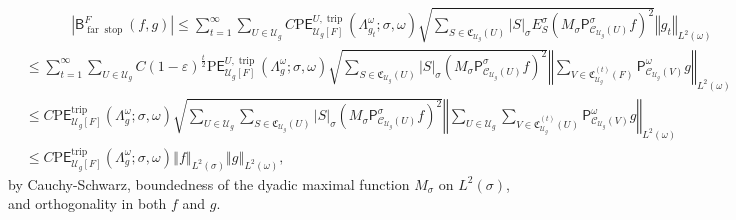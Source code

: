 \documentclass{amsart}%
\theoremstyle{plain}
\numberwithin{equation}{section}
\begin{document}
\begin{align}
& \ \ \ \ \ \ \ \ \ \ \ \ \ \ \ \left\vert \mathsf{B}_{\operatorname{far}%
\operatorname*{stop}}^{F}\left(  f,g\right)  \right\vert \leq\sum
_{t=1}^{\infty}\sum_{U\in\mathcal{U}_{g}}C\mathrm{P}\mathsf{E}_{\mathcal{U}%
_{g}\left[  F\right]  }^{U,\operatorname*{trip}}\left(  \Lambda_{g_{t}%
}^{\omega};\sigma,\omega\right)  \sqrt{\sum_{S\in\mathfrak{C}_{\mathcal{U}%
_{g}}\left(  U\right)  }\left\vert S\right\vert _{\sigma}E_{S}^{\sigma}\left(
M_{\sigma}\mathsf{P}_{\mathcal{C}_{\mathcal{U}_{g}}\left(  U\right)  }%
^{\sigma}f\right)  ^{2}}\left\Vert g_{t}\right\Vert _{L^{2}\left(
\omega\right)  }\label{far below stop}\\
& \leq\sum_{t=1}^{\infty}\sum_{U\in\mathcal{U}_{g}}C\left(  1-\varepsilon
\right)  ^{\frac{t}{2}}\mathrm{P}\mathsf{E}_{\mathcal{U}_{g}\left[  F\right]
}^{U,\operatorname*{trip}}\left(  \Lambda_{g}^{\omega};\sigma,\omega\right)
\sqrt{\sum_{S\in\mathfrak{C}_{\mathcal{U}_{g}}\left(  U\right)  }\left\vert
S\right\vert _{\sigma}\left(  M_{\sigma}\mathsf{P}_{\mathcal{C}_{\mathcal{U}%
_{g}}\left(  U\right)  }^{\sigma}f\right)  ^{2}}\left\Vert \sum_{V\in
\mathfrak{C}_{\mathcal{U}_{g}}^{\left(  t\right)  }\left(  F\right)
}\mathsf{P}_{\mathcal{C}_{\mathcal{U}_{g}}\left(  V\right)  }^{\omega
}g\right\Vert _{L^{2}\left(  \omega\right)  }\nonumber\\
& \leq C\mathrm{P}\mathsf{E}_{\mathcal{U}_{g}\left[  F\right]  }%
^{\operatorname*{trip}}\left(  \Lambda_{g}^{\omega};\sigma,\omega\right)
\sqrt{\sum_{U\in\mathcal{U}_{g}}\sum_{S\in\mathfrak{C}_{\mathcal{U}_{g}%
}\left(  U\right)  }\left\vert S\right\vert _{\sigma}\left(  M_{\sigma
}\mathsf{P}_{\mathcal{C}_{\mathcal{U}_{g}}\left(  U\right)  }^{\sigma
}f\right)  ^{2}}\left\Vert \sum_{U\in\mathcal{U}_{g}}\sum_{V\in\mathfrak{C}%
_{\mathcal{U}_{g}}^{\left(  t\right)  }\left(  U\right)  }\mathsf{P}%
_{\mathcal{C}_{\mathcal{U}_{g}}\left(  V\right)  }^{\omega}g\right\Vert
_{L^{2}\left(  \omega\right)  }\nonumber\\
& \leq C\mathrm{P}\mathsf{E}_{\mathcal{U}_{g}\left[  F\right]  }%
^{\operatorname*{trip}}\left(  \Lambda_{g}^{\omega};\sigma,\omega\right)
\left\Vert f\right\Vert _{L^{2}\left(  \sigma\right)  }\left\Vert g\right\Vert
_{L^{2}\left(  \omega\right)  },\nonumber
\end{align}
by Cauchy-Schwarz, boundedness of the dyadic maximal function $M_{\sigma}$ on
$L^{2}\left(  \sigma\right)  $, and orthogonality in both $f$ and $g$.
\end{document}

